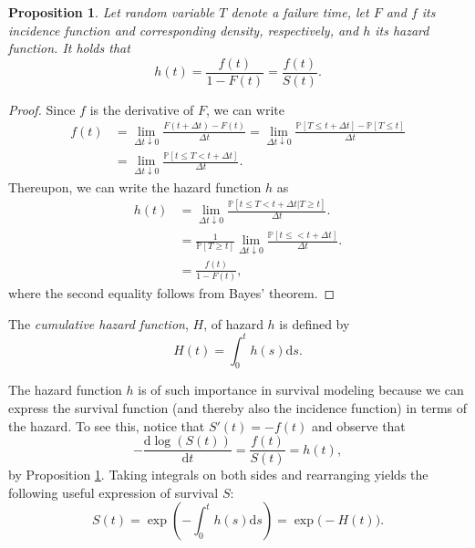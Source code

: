 \documentclass[11pt]{article}
\renewcommand{\P}{\mathbb{P}}
\renewcommand{\d}{\text{d}}
\newtheorem{proposition}[theorem]{Proposition}
\begin{document}
\begin{proposition} \label{prop:hazard}
Let random variable $T$ denote a failure time, let $F$ and $f$ its incidence function and corresponding density, respectively, and $h$ its hazard function. It holds that
\[
	h(t) = \frac{f(t)}{1 - F(t)} = \frac{f(t)}{S(t)}.
\]
\end{proposition}
\begin{proof}
Since $f$ is the derivative of $F$, we can write
\begin{align*}
	f(t) 
	&=
	\lim_{\Delta t\downarrow 0} \frac{F(t + \Delta t) - F(t)}{\Delta t}
	=
	\lim_{\Delta t\downarrow 0} \frac{\P[ T \leq t + \Delta t] - \P[T \leq t]}{\Delta t}
	\\
	&=
	\lim_{\Delta t\downarrow 0} \frac{\P[t \leq T < t + \Delta t]}{\Delta t}.
\end{align*}
Thereupon, we can write the hazard function $h$ as
\begin{align*}
	h(t) 
	&=
	\lim_{\Delta t\downarrow 0}\frac{\P[t \leq T < t + \Delta t| T \geq t]}{\Delta t}.
	\\
	&=
	\frac{1}{\P[T \geq t]}
	\lim_{\Delta t\downarrow 0} \frac{\P[t \leq < t + \Delta t]}{\Delta t}.
	\\
	&=
	\frac{f(t)}{1 - F(t)},
\end{align*}
where the second equality follows from Bayes' theorem.
\end{proof}

The \textit{cumulative hazard function}, $H$, of hazard $h$ is defined by
\[
    H(t) = \int_0^t h(s) \d s.
\]

The hazard function $h$ is of such importance in survival modeling because we can express the survival function (and thereby also the incidence function) in terms of the hazard. To see this, notice that $S'(t) = -f(t)$ and observe that
\[
	- \frac{\d \log(S(t))}{\d t} = \frac{f(t)}{S(t)} = h(t),
\]
by Proposition \ref{prop:hazard}. Taking integrals on both sides and rearranging yields the following useful expression of survival $S$:
\[
	S(t) = \exp \left( - \int_0^t h(s) \d s \right) = \exp \big( - H(t) \big).
\]
\end{document}
